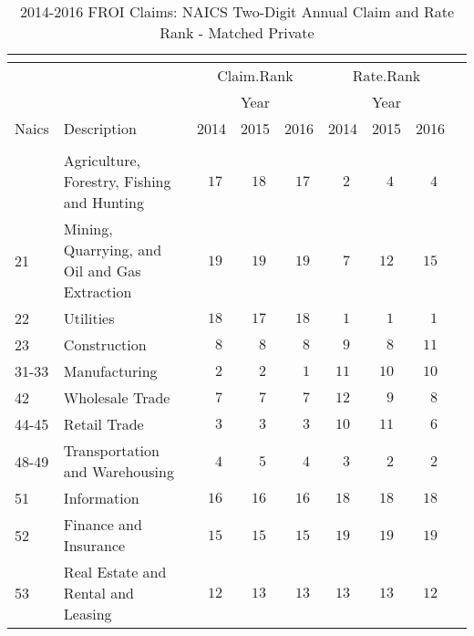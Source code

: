 \documentclass[9pt, oneside]{article}   	%
\begin{document}
\pagebreak


\begin{longtable}{lp{3 in}ccccccc}

\caption{2014-2016 FROI Claims: NAICS Two-Digit  Annual Claim and Rate Rank - Matched Private}\\ 
\label{Table: 10a.MPr}\\
\hline
                          \toprule
 &  & \multicolumn{3}{c}{Claim.Rank} & \multicolumn{3}{c}{Rate.Rank} \\ 
 &  & \multicolumn{3}{c}{Year} & \multicolumn{3}{c}{Year} \\ 
Naics  & Description & 2014 & 2015 & 2016 & 2014 & 2015 & \multicolumn{1}{c}{2016} \\ 
\midrule\\ [-1\normalbaselineskip]\hline\endhead\hline\endfoot
11  & Agriculture, Forestry, Fishing and Hunting & $\phantom{0}17$ & $\phantom{0}18$ & $\phantom{0}17$ & $\phantom{0}2$ & $\phantom{0}4$ & $\phantom{0}4$ \\
21  & Mining, Quarrying, and Oil and Gas Extraction & $\phantom{0}19$ & $\phantom{0}19$ & $\phantom{0}19$ & $\phantom{0}7$ & $12$ & $15$ \\
22  & Utilities & $\phantom{0}18$ & $\phantom{0}17$ & $\phantom{0}18$ & $\phantom{0}1$ & $\phantom{0}1$ & $\phantom{0}1$ \\
23  & Construction & $\phantom{00}8$ & $\phantom{00}8$ & $\phantom{00}8$ & $\phantom{0}9$ & $\phantom{0}8$ & $11$ \\
31-33  & Manufacturing & $\phantom{00}2$ & $\phantom{00}2$ & $\phantom{00}1$ & $11$ & $10$ & $10$ \\
42  & Wholesale Trade & $\phantom{00}7$ & $\phantom{00}7$ & $\phantom{00}7$ & $12$ & $\phantom{0}9$ & $\phantom{0}8$ \\
44-45  & Retail Trade & $\phantom{00}3$ & $\phantom{00}3$ & $\phantom{00}3$ & $10$ & $11$ & $\phantom{0}6$ \\
48-49  & Transportation and Warehousing & $\phantom{00}4$ & $\phantom{00}5$ & $\phantom{00}4$ & $\phantom{0}3$ & $\phantom{0}2$ & $\phantom{0}2$ \\
51  & Information & $\phantom{0}16$ & $\phantom{0}16$ & $\phantom{0}16$ & $18$ & $18$ & $18$ \\
52  & Finance and Insurance & $\phantom{0}15$ & $\phantom{0}15$ & $\phantom{0}15$ & $19$ & $19$ & $19$ \\
53  & Real Estate and Rental and Leasing & $\phantom{0}12$ & $\phantom{0}13$ & $\phantom{0}13$ & $13$ & $13$ & $12$ \\

\end{longtable}
\end{document}

